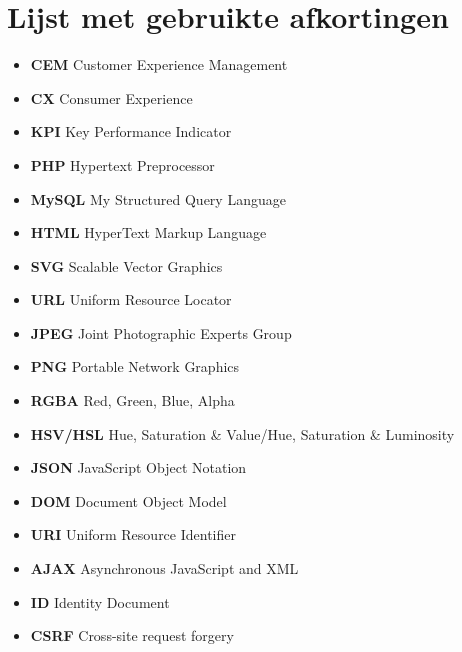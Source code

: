 \chapter{Lijst met gebruikte afkortingen}

\begin{itemize}
\item[] \textbf{CEM} \qquad Customer Experience Management
\item[] \textbf{CX} \qquad Consumer Experience
\item[] \textbf{KPI} \qquad Key Performance Indicator
\item[] \textbf{PHP} \qquad Hypertext Preprocessor
\item[] \textbf{MySQL} \qquad My Structured Query Language
\item[] \textbf{HTML} \qquad HyperText Markup Language
\item[] \textbf{SVG} \qquad Scalable Vector Graphics
\item[] \textbf{URL} \qquad Uniform Resource Locator
\item[] \textbf{JPEG} \qquad Joint Photographic Experts Group
\item[] \textbf{PNG} \qquad Portable Network Graphics
\item[] \textbf{RGBA} \qquad Red, Green, Blue, Alpha
\item[] \textbf{HSV/HSL} \qquad Hue, Saturation \& Value/Hue, Saturation \& Luminosity
\item[] \textbf{JSON} \qquad JavaScript Object Notation
\item[] \textbf{DOM} \qquad Document Object Model
\item[] \textbf{URI} \qquad Uniform Resource Identifier
\item[] \textbf{AJAX} \qquad Asynchronous JavaScript and XML
\item[] \textbf{ID} \qquad Identity Document
\item[] \textbf{CSRF} \qquad Cross-site request forgery
\end{itemize}	


